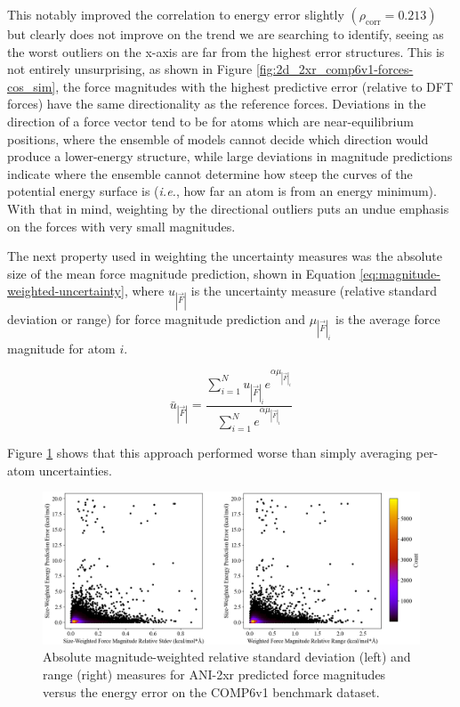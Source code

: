 This notably improved the correlation to energy error slightly $(\rho_{\text{corr}}=0.213)$ but clearly does not improve on the trend we are searching to identify, seeing as the worst outliers on the x-axis are far from the highest error structures.
This is not entirely unsurprising, as shown in Figure \ref{fig:2d_2xr_comp6v1-forces-cos_sim}, the force magnitudes with the highest predictive error (relative to DFT forces) have the same directionality as the reference forces.
Deviations in the direction of a force vector tend to be for atoms which are near-equilibrium positions, where the ensemble of models cannot decide which direction would produce a lower-energy structure, while large deviations in magnitude predictions indicate where the ensemble cannot determine how steep the curves of the potential energy surface is (\textit{i.e.}, how far an atom is from an energy minimum).
With that in mind, weighting by the directional outliers puts an undue emphasis on the forces with very small magnitudes.

The next property used in weighting the uncertainty measures was the absolute size of the mean force magnitude prediction, shown in Equation \ref{eq:magnitude-weighted-uncertainty}, where $u_{|\vec{F}|}$ is the uncertainty measure (relative standard deviation or range) for force magnitude prediction and $\mu_{|\vec{F}|_i}$ is the average force magnitude for atom $i$.

\begin{equation}
    \bar{u}_{|\vec{F}|} = \frac{\sum_{i=1}^{N} u_{|\vec{F}|_i} e^{\alpha \mu_{|\vec{F}|_i}}}{\sum_{i=1}^{N} e^{\alpha \mu_{|\vec{F}|_i}}}
    \label{eq:magnitude-weighted-uncertainty}
\end{equation}

Figure \ref{fig:2xr_comp6v1-forces-weighed_uncertainty} shows that this approach performed worse than simply averaging per-atom uncertainties. 

\begin{figure}[H]
    \centering
    \includegraphics[width=1\linewidth]{Images/2xr_forces/weighted_uncertainty-vs-size_weighted_error.png}
    \caption[Force uncertainty weighted by outliers versus energy error (COMP6v1)]{Absolute magnitude-weighted relative standard deviation (left) and range (right) measures for ANI-2xr predicted force magnitudes versus the energy error on the COMP6v1 benchmark dataset.}
    \label{fig:2xr_comp6v1-forces-weighed_uncertainty}
\end{figure}

